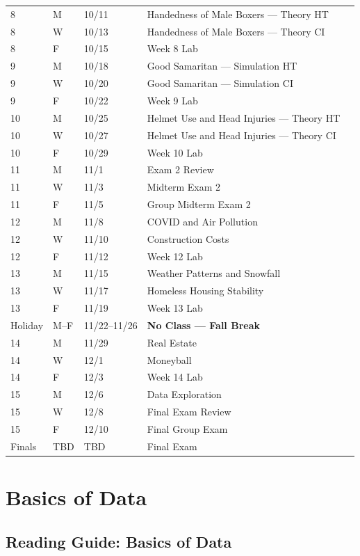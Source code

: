 \documentclass[
]{report}
\begin{document}
\begin{longtable}{|l|l|l|l|p{}|}
8& M& 10/11& Handedness of Male Boxers --- Theory HT \\*
8& W& 10/13& Handedness of Male Boxers --- Theory CI \\*    
8& F& 10/15& Week 8 Lab \\ \hline
9& M& 10/18& Good Samaritan --- Simulation HT \\*
9& W& 10/20& Good Samaritan --- Simulation CI \\*   
9& F& 10/22& Week 9 Lab \\ \hline
10& M& 10/25& Helmet Use and Head Injuries --- Theory HT \\*
10& W& 10/27& Helmet Use and Head Injuries --- Theory CI \\*
10& F& 10/29& Week 10 Lab\\ \hline
11& M& 11/1& Exam 2 Review \\*
11& W& 11/3& Midterm Exam 2 \\* 
11& F& 11/5& Group Midterm Exam 2 \\ \hline
12& M& 11/8& COVID and Air Pollution \\*
12& W& 11/10& Construction Costs \\*
12& F& 11/12& Week 12 Lab \\ \hline
13& M& 11/15& Weather Patterns and Snowfall \\*
13& W& 11/17& Homeless Housing Stability \\*
13& F& 11/19& Week 13 Lab \\ \hline
Holiday& M--F& 11/22--11/26& \textbf{No Class --- Fall Break} \\ \hline
14& M& 11/29& Real Estate \\*
14& W& 12/1& Moneyball \\*
14& F& 12/3& Week 14 Lab \\ \hline
15& M& 12/6& Data Exploration \\*
15& W& 12/8& Final Exam Review \\*
15& F& 12/10& Final Group Exam \\ \hline
Finals& TBD & TBD & Final Exam \\ \hline

\end{longtable}

\hypertarget{basics-of-data}{%
\chapter{Basics of Data}\label{basics-of-data}}

\hypertarget{reading-guide-basics-of-data}{%
\section{Reading Guide: Basics of Data}\label{reading-guide-basics-of-data}}
\end{document}
